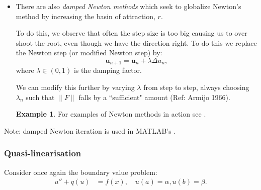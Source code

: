 \documentclass[12pt, a4paper]{article}
\renewcommand{\vec}[1]{\mathbf{#1}}
\theoremstyle{definition}
\newtheorem{example}[thm]{Example}
\theoremstyle{remark}
\numberwithin{equation}{section}
\begin{document}
\begin{enumerate}
\begin{itemize}
Instead of solving the system $\vec{F}(\vec{u})=\vec{0}$ for $\vec{u}_0$ we ``creep up" on our solution using a parameter of the problem
 \begin{example}
It might be hard to slve the problem with the true parameter value $B=3$. Instead solve with $B=1$, then use that solution as initial guess for $B=2$ etc. 
 \end{example}
 or  by inserting a parameter:
\begin{equation*}
\vec{F}_\lambda(\vec{u})=\lambda \vec{F}(\vec{u}) + (1-\lambda)\vec{G}(\vec{u})=0,
\end{equation*}
where we want to solve $\vec{F}(\vec{u}) = 0$ but $\vec{G}(\vec{u}) = 0$ is much easier to solve. We creep up on our solution by slowly varying $\lambda$ from $0$ to $1$ using the last solution to solve for the next step.

\item There are also \emph{damped Newton methods} which seek to globalize Newton's method by increasing the basin of attraction, $r$.

To do this, we observe that often the step size is too big causing us to over shoot the root, even though we have the direction right.
To do this we replace the Newton step (or modified Newton step) by:
\begin{equation*}
\vec{u}_{n+1}=\vec{u}_n+\lambda\Delta u_n,
\end{equation*}
where $\lambda \in (0,1)$ is the damping factor.

We can modify this further by varying $\lambda$ from step to step, always choosing $\lambda_n$ such that $\|F\|$ falls by a ``sufficient" amount (Ref: Armijo 1966).

 \begin{example}
 For examples of Newton methods in action see .
  \end{example}
\end{itemize}
\end{enumerate}

Note: damped Newton iteration is used in MATLAB's .

\newpage
\subsubsection{Quasi-linearisation}

Consider once again the boundary value problem:
\begin{align*}
u''+q(u)&=f(x), \quad u(a)=\alpha, u(b)=\beta.
\end{align*}
\end{document}
